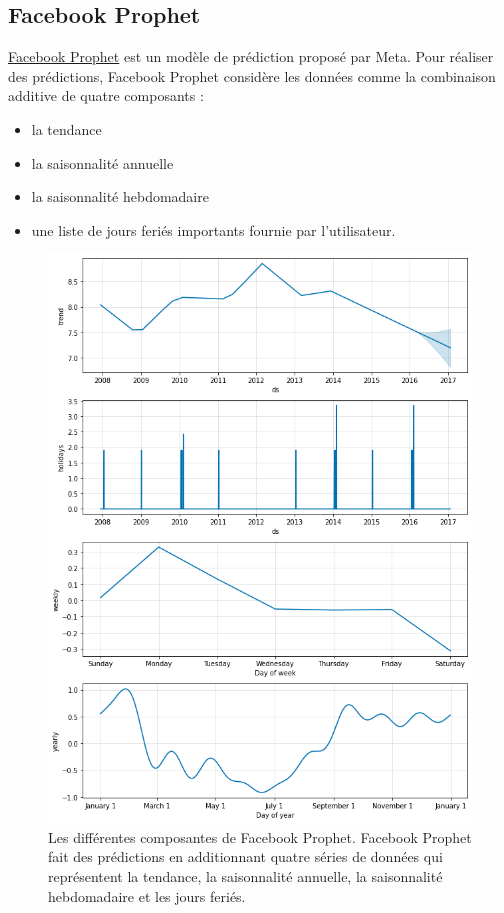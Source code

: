 \documentclass[french]{article}
\begin{document}
    \subsection{Facebook Prophet}

    \href{https://facebook.github.io/prophet/}{Facebook Prophet} est un modèle de prédiction proposé par Meta. 
    Pour réaliser des prédictions, Facebook Prophet considère les données comme la combinaison additive de quatre composants\cite{meta} : 
    \begin{itemize}
        \item la tendance
        \item la saisonnalité annuelle
        \item la saisonnalité hebdomadaire
        \item une liste de jours feriés importants fournie par l'utilisateur.
    \end{itemize}
    \begin{figure}[h!]
        \includegraphics[width=12cm]{facebook_prophet}
        \centering
        \caption{Les différentes composantes de Facebook Prophet. Facebook Prophet fait des prédictions en additionnant quatre séries de données qui représentent la tendance, la saisonnalité annuelle, la saisonnalité hebdomadaire et les jours feriés.}
        \centering
    \end{figure}
\end{document}
